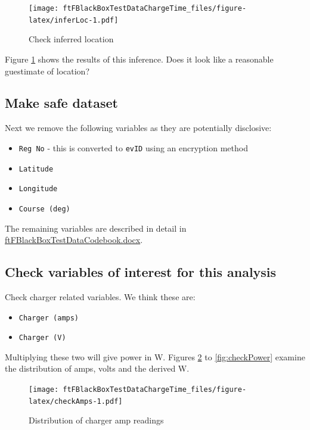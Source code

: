 \documentclass[]{article}
\providecommand{\tightlist}{%
  \setlength{\itemsep}{0pt}\setlength{\parskip}{0pt}}
\begin{document}
\begin{figure}
\centering
\texttt{[image: ftFBlackBoxTestDataChargeTime\_files/figure-latex/inferLoc-1.pdf]}
\caption{\label{fig:inferLoc}Check inferred location}
\end{figure}

Figure \ref{fig:inferLoc} shows the results of this inference. Does it
look like a reasonable guestimate of location?

\subsection{Make safe dataset}\label{make-safe-dataset}

Next we remove the following variables as they are potentially
disclosive:

\begin{itemize}
\tightlist
\item
  \texttt{Reg\ No} - this is converted to \texttt{evID} using an
  encryption method
\item
  \texttt{Latitude}
\item
  \texttt{Longitude}
\item
  \texttt{Course\ (deg)}
\end{itemize}

The remaining variables are described in detail in
\href{https://www.dropbox.com/s/bfepx3sgfxek78e/ftFBlackBoxTestDataCodebook.docx?dl=0}{ftFBlackBoxTestDataCodebook.docx}.

\subsection{Check variables of interest for this
analysis}\label{check-variables-of-interest-for-this-analysis}

Check charger related variables. We think these are:

\begin{itemize}
\tightlist
\item
  \texttt{Charger\ (amps)}
\item
  \texttt{Charger\ (V)}
\end{itemize}

Multiplying these two will give power in W. Figures \ref{fig:checkAmps}
to \ref{fig:checkPower} examine the distribution of amps, volts and the
derived W.

\begin{figure}
\centering
\texttt{[image: ftFBlackBoxTestDataChargeTime\_files/figure-latex/checkAmps-1.pdf]}
\caption{\label{fig:checkAmps}Distribution of charger amp readings}
\end{figure}
\end{document}
